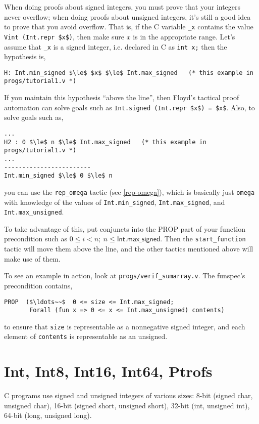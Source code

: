 \documentclass[12pt,fleqn,openany,oneside,showtrims]{memoir}
\begin{document}
When doing proofs about signed integers,
you must prove that your integers never overflow;
when doing proofs about unsigned integers,
it's still a good idea to prove that you avoid
overflow.  That is,
if the C variable \lstinline{_x} contains the value
\lstinline{Vint (Int.repr $x$)}, then make sure $x$ is in
the appropriate range.  Let's assume that \lstinline{_x}
is a signed integer, i.e. declared in C as \lstinline{int x;}
then the hypothesis is,
\begin{lstlisting}
H: Int.min_signed $\le$ $x$ $\le$ Int.max_signed   (* this example in progs/tutorial1.v *)
\end{lstlisting}
If you maintain this hypothesis ``above the line'',
then Floyd's tactical proof automation
can solve goals such as
\lstinline{Int.signed (Int.repr $x$) = $x$}.
Also, to solve goals such as,
\begin{lstlisting}
...
H2 : 0 $\le$ n $\le$ Int.max_signed   (* this example in progs/tutorial1.v *)
...
------------------------
Int.min_signed $\le$ 0 $\le$ n
\end{lstlisting}
you can use the \lstinline{rep_omega} tactic (see \autoref{rep-omega}),
which is basically just \lstinline{omega} with
knowledge of the values of
\lstinline{Int.min_signed},
\lstinline{Int.max_signed},
and \lstinline{Int.max_unsigned}.

To take advantage of this, put
conjuncts into the PROP part of your function precondition
such as $0\le i < n; ~n \le \mathsf{Int.max\_signed}$.
Then the \lstinline{start_function} tactic will move them
above the line, and the other tactics mentioned
above will make use of them.

To see an example in action, look
at \lstinline{progs/verif_sumarray.v}.
The funspec's precondition contains,
\begin{lstlisting}
PROP  ($\ldots~~$  0 <= size <= Int.max_signed;
       Forall (fun x => 0 <= x <= Int.max_unsigned) contents)
\end{lstlisting}
\vspace{-\baselineskip}
to ensure that \lstinline{size} is representable
as a nonnegative signed integer,
and each element of \lstinline{contents}
is representable as an unsigned.

\chapter{Int, Int8, Int16, Int64, Ptrofs}

C programs use signed and unsigned integers of various sizes:
8-bit (signed char, unsigned char), 16-bit (signed short, unsigned short),
32-bit (int, unsigned int), 64-bit (long, unsigned long).
\end{document}
